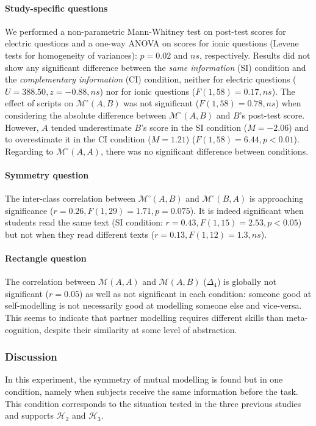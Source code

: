\documentclass[natbib]{svjour3}
\newcommand{\gmodel}[2]{{$\mathcal{M}(#1, #2)$}}
\newcommand{\gModel}[2]{{$\mathcal{M}^{\circ}(#1, #2)$}}
\begin{document}
\paragraph{Study-specific questions} We performed a non-parametric Mann-Whitney
test on post-test scores for electric questions and a one-way ANOVA on scores
for ionic questions (Levene tests for homogeneity of variances): $p = 0.02$ and
$ns$, respectively. Results  did not show any significant difference between the
\emph{same information} (SI) condition and the \emph{complementary information}
(CI) condition, neither for electric questions ($U = 388.50, z = -0.88, ns$) nor
for ionic questions ($F(1, 58) = 0.17, ns$).  The effect of scripts on
\gModel{A}{B} was not significant ($F(1, 58) = 0.78, ns$) when considering the
absolute difference between \gModel{A}{B} and $B$'s post-test score. However, $A$
tended underestimate $B$'s score in the SI condition ($M = -2.06$) and to
overestimate it in the CI condition ($M = 1.21$) ($F(1, 58) = 6.44, p<0.01$).
Regarding to \gModel{A}{A}, there was no significant difference between
conditions.

\paragraph{Symmetry question} The inter-class correlation between \gModel{A}{B}
and \gModel{B}{A} is approaching significance ($r= 0.26, F(1,29)=1.71, p=
0.075$). It is indeed significant when students read the same text (SI
condition: $r=0.43, F(1,15)=2.53, p<0.05$) but not when they read different texts
($r= 0.13, F(1,12)=1.3, ns$). 

\paragraph{Rectangle question} The correlation between \gmodel{A}{A} and
\gmodel{A}{B} ($\Delta_4$) is globally not significant ($r=0.05$) as well as not
significant in each condition: someone good at self-modelling is not necessarily
good at modelling someone else and vice-versa.  This seems to indicate that
partner modelling requires different skills than meta-cognition, despite their
similarity at some level of abstraction.

\subsubsection*{Discussion}

In this experiment, the symmetry of mutual modelling is  found but  in one
condition, namely when subjects receive the same information before the task.
This condition corresponds to the situation tested in the three previous studies
and supports  $\mathcal{H}_{2}$ and  $\mathcal{H}_{3}$. 
\end{document}
